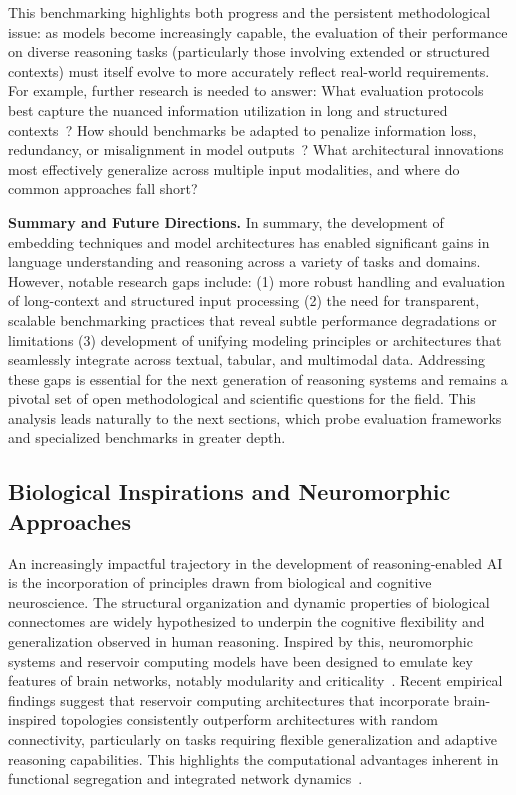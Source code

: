 \documentclass[sigconf]{acmart}
\begin{document}
This benchmarking highlights both progress and the persistent methodological issue: as models become increasingly capable, the evaluation of their performance on diverse reasoning tasks (particularly those involving extended or structured contexts) must itself evolve to more accurately reflect real-world requirements. For example, further research is needed to answer: What evaluation protocols best capture the nuanced information utilization in long and structured contexts~\cite{ref70}? How should benchmarks be adapted to penalize information loss, redundancy, or misalignment in model outputs~\cite{ref75}? What architectural innovations most effectively generalize across multiple input modalities, and where do common approaches fall short?

\textbf{Summary and Future Directions.} In summary, the development of embedding techniques and model architectures has enabled significant gains in language understanding and reasoning across a variety of tasks and domains. However, notable research gaps include: (1) more robust handling and evaluation of long-context and structured input processing (2) the need for transparent, scalable benchmarking practices that reveal subtle performance degradations or limitations (3) development of unifying modeling principles or architectures that seamlessly integrate across textual, tabular, and multimodal data. Addressing these gaps is essential for the next generation of reasoning systems and remains a pivotal set of open methodological and scientific questions for the field. This analysis leads naturally to the next sections, which probe evaluation frameworks and specialized benchmarks in greater depth.

\subsection{Biological Inspirations and Neuromorphic Approaches}

An increasingly impactful trajectory in the development of reasoning-enabled AI is the incorporation of principles drawn from biological and cognitive neuroscience. The structural organization and dynamic properties of biological connectomes are widely hypothesized to underpin the cognitive flexibility and generalization observed in human reasoning. Inspired by this, neuromorphic systems and reservoir computing models have been designed to emulate key features of brain networks, notably modularity and criticality~\cite{ref90}. Recent empirical findings suggest that reservoir computing architectures that incorporate brain-inspired topologies consistently outperform architectures with random connectivity, particularly on tasks requiring flexible generalization and adaptive reasoning capabilities. This highlights the computational advantages inherent in functional segregation and integrated network dynamics~\cite{ref90}.
\end{document}
